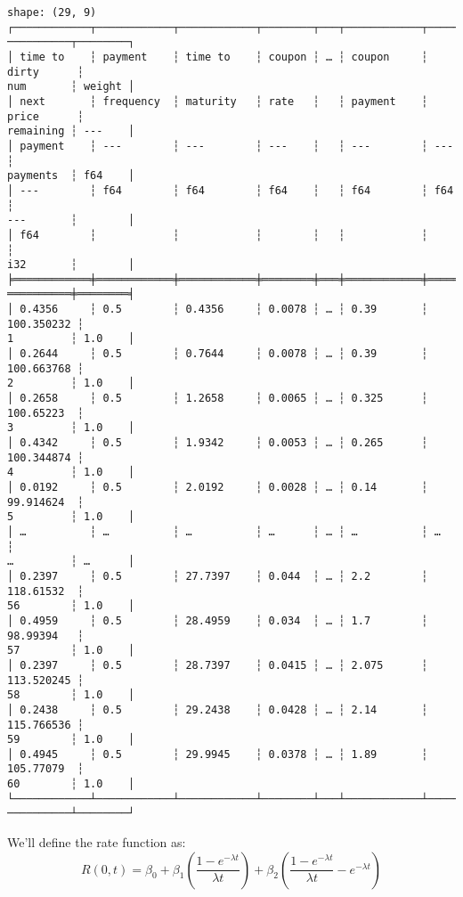 \documentclass[11pt]{article}
\makeatletter
\newcommand{\boxspacing}{\kern\kvtcb@left@rule\kern\kvtcb@boxsep}
\newcommand{\prompt}[4]{
        {\ttfamily\llap{{\color{#2}[#3]:\hspace{3pt}#4}}\vspace{-\baselineskip}}
    }
\makeatother
\begin{document}
            \begin{tcolorbox}[breakable, size=fbox, boxrule=.5pt, pad at break*=1mm, opacityfill=0]
\prompt{Out}{outcolor}{ }{\boxspacing}
\begin{Verbatim}[commandchars=\\\{\}]
shape: (29, 9)
┌────────────┬────────────┬────────────┬────────┬───┬────────────┬────────────┬─
──────────┬────────┐
│ time to    ┆ payment    ┆ time to    ┆ coupon ┆ … ┆ coupon     ┆ dirty      ┆
num       ┆ weight │
│ next       ┆ frequency  ┆ maturity   ┆ rate   ┆   ┆ payment    ┆ price      ┆
remaining ┆ ---    │
│ payment    ┆ ---        ┆ ---        ┆ ---    ┆   ┆ ---        ┆ ---        ┆
payments  ┆ f64    │
│ ---        ┆ f64        ┆ f64        ┆ f64    ┆   ┆ f64        ┆ f64        ┆
---       ┆        │
│ f64        ┆            ┆            ┆        ┆   ┆            ┆            ┆
i32       ┆        │
╞════════════╪════════════╪════════════╪════════╪═══╪════════════╪════════════╪═
══════════╪════════╡
│ 0.4356     ┆ 0.5        ┆ 0.4356     ┆ 0.0078 ┆ … ┆ 0.39       ┆ 100.350232 ┆
1         ┆ 1.0    │
│ 0.2644     ┆ 0.5        ┆ 0.7644     ┆ 0.0078 ┆ … ┆ 0.39       ┆ 100.663768 ┆
2         ┆ 1.0    │
│ 0.2658     ┆ 0.5        ┆ 1.2658     ┆ 0.0065 ┆ … ┆ 0.325      ┆ 100.65223  ┆
3         ┆ 1.0    │
│ 0.4342     ┆ 0.5        ┆ 1.9342     ┆ 0.0053 ┆ … ┆ 0.265      ┆ 100.344874 ┆
4         ┆ 1.0    │
│ 0.0192     ┆ 0.5        ┆ 2.0192     ┆ 0.0028 ┆ … ┆ 0.14       ┆ 99.914624  ┆
5         ┆ 1.0    │
│ …          ┆ …          ┆ …          ┆ …      ┆ … ┆ …          ┆ …          ┆
…         ┆ …      │
│ 0.2397     ┆ 0.5        ┆ 27.7397    ┆ 0.044  ┆ … ┆ 2.2        ┆ 118.61532  ┆
56        ┆ 1.0    │
│ 0.4959     ┆ 0.5        ┆ 28.4959    ┆ 0.034  ┆ … ┆ 1.7        ┆ 98.99394   ┆
57        ┆ 1.0    │
│ 0.2397     ┆ 0.5        ┆ 28.7397    ┆ 0.0415 ┆ … ┆ 2.075      ┆ 113.520245 ┆
58        ┆ 1.0    │
│ 0.2438     ┆ 0.5        ┆ 29.2438    ┆ 0.0428 ┆ … ┆ 2.14       ┆ 115.766536 ┆
59        ┆ 1.0    │
│ 0.4945     ┆ 0.5        ┆ 29.9945    ┆ 0.0378 ┆ … ┆ 1.89       ┆ 105.77079  ┆
60        ┆ 1.0    │
└────────────┴────────────┴────────────┴────────┴───┴────────────┴────────────┴─
──────────┴────────┘
\end{Verbatim}
\end{tcolorbox}
        
    We'll define the rate function as:
\[ R(0, t) = \beta_0 + \beta_1 \left(\frac{1 - e^{-\lambda t}}{\lambda t}\right) + \beta_2 \left(\frac{1 - e^{-\lambda t}}{\lambda t} - e^{-\lambda t}\right)\]
\end{document}
